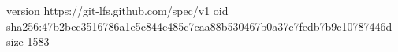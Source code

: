 version https://git-lfs.github.com/spec/v1
oid sha256:47b2bec3516786a1e5c844c485c7caa88b530467b0a37c7fedb7b9c10787446d
size 1583
